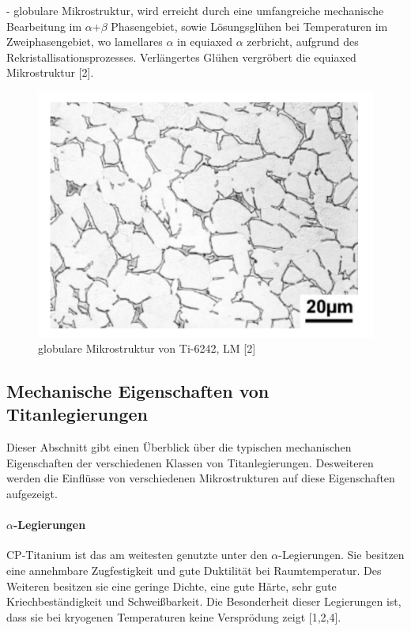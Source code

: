 - globulare Mikrostruktur, wird erreicht durch eine umfangreiche mechanische Bearbeitung im $\alpha$+$\beta$ Phasengebiet, sowie Lösungsglühen bei Temperaturen im Zweiphasengebiet, wo lamellares $\alpha$ in equiaxed $\alpha$ zerbricht, aufgrund des Rekristallisationsprozesses. Verlängertes Glühen vergröbert die equiaxed Mikrostruktur [2].

\begin{figure}[h]
	\centering
	\includegraphics[width=0.7\linewidth]{"Bilder/Abbildung 5"}
	\caption[Abbildung 5]{globulare Mikrostruktur von Ti-6242, LM [2]}
	\label{fig:abbildung-5}
\end{figure}



\subsection{Mechanische Eigenschaften von Titanlegierungen}

Dieser Abschnitt gibt einen Überblick über die typischen mechanischen Eigenschaften der verschiedenen Klassen von Titanlegierungen. Desweiteren werden die Einflüsse von verschiedenen Mikrostrukturen auf diese Eigenschaften aufgezeigt.

\paragraph{$\alpha$-Legierungen} 
CP-Titanium ist das am weitesten genutzte unter den $\alpha$-Legierungen. Sie besitzen eine annehmbare Zugfestigkeit und gute Duktilität bei Raumtemperatur. Des Weiteren besitzen sie eine geringe Dichte, eine gute Härte, sehr gute Kriechbeständigkeit und Schweißbarkeit. Die Besonderheit dieser Legierungen ist, dass sie bei kryogenen Temperaturen keine Versprödung zeigt [1,2,4].

